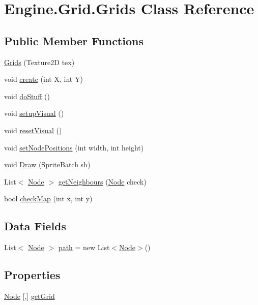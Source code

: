 \hypertarget{a00406}{}\section{Engine.\+Grid.\+Grids Class Reference}
\label{a00406}
\subsection*{Public Member Functions}
\begin{DoxyCompactItemize}
\item 
\hyperlink{a00406_a93c6400681153abcf5bf341f72e77277}{Grids} (Texture2D tex)
\item 
void \hyperlink{a00406_a42a73fb81510d705071435c621d12c72}{create} (int X, int Y)
\item 
void \hyperlink{a00406_abaa6e136966cf7c17141a042c5ac1d71}{do\+Stuff} ()
\item 
void \hyperlink{a00406_aec9a6ddb83a21aa1e3ef16dc8cae4808}{setup\+Visual} ()
\item 
void \hyperlink{a00406_a036d69651829420e4494004d9cf73b71}{reset\+Visual} ()
\item 
void \hyperlink{a00406_ab0cc24116dc6df9c8d0acdc6b0d51b0d}{set\+Node\+Positions} (int width, int height)
\item 
void \hyperlink{a00406_ab8bebc68904ff66b2a10832f2540e188}{Draw} (Sprite\+Batch sb)
\item 
List$<$ \hyperlink{a00414}{Node} $>$ \hyperlink{a00406_a3380ff062497543fe12b24a0e3ddfc46}{get\+Neighbours} (\hyperlink{a00414}{Node} check)
\item 
bool \hyperlink{a00406_a0f0825c55c7d8a17b163f74fc8baa9de}{check\+Map} (int x, int y)
\end{DoxyCompactItemize}
\subsection*{Data Fields}
\begin{DoxyCompactItemize}
\item 
List$<$ \hyperlink{a00414}{Node} $>$ \hyperlink{a00406_ad9776283305f0c420d4a544d418a7c40}{path} = new List$<$\hyperlink{a00414}{Node}$>$()
\end{DoxyCompactItemize}
\subsection*{Properties}
\begin{DoxyCompactItemize}
\item 
\hyperlink{a00414}{Node} \mbox{[},\mbox{]} \hyperlink{a00406_a272de0996ab650f3dde958644d26b032}{get\+Grid}
\end{DoxyCompactItemize}


